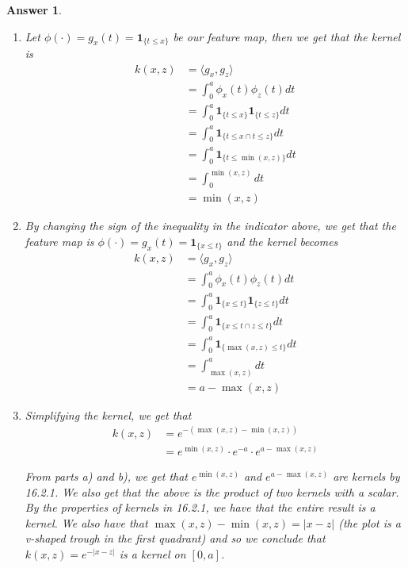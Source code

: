 \documentclass[12pt]{article}
\theoremstyle{colon}
\newtheorem*{answer}{Answer}
\begin{document}
\begin{answer}
  \

  \begin{enumerate}[label=\alph*)]
    \item Let $\phi(\cdot) = g_x(t) = \bm{1}_{\{t \leq x\}}$ be our feature map, then we get that the kernel is
      \begin{align*}
        k(x, z) &= \langle g_x, g_z \rangle \\
        &= \int_0^a \phi_x(t) \phi_z(t) dt \\
        &= \int_0^a \bm{1}_{\{t \leq x\}} \bm{1}_{\{t \leq z\}} dt \\
        &= \int_0^a \bm{1}_{\{t \leq x \cap t \leq z\}} dt \\
        &= \int_0^a \bm{1}_{\{t \leq \min(x,z)\}} dt \\
        &= \int_0^{\min(x,z)} dt \\
        &= \min(x,z)
      \end{align*}

    \item By changing the sign of the inequality in the indicator above, we get that the feature map is $\phi(\cdot) = g_x(t) = \bm{1}_{\{x \leq t\}}$ and the kernel becomes
      \begin{align*}
        k(x, z) &= \langle g_x, g_z \rangle \\
        &= \int_0^a \phi_x(t) \phi_z(t) dt \\
        &= \int_0^a \bm{1}_{\{x \leq t\}} \bm{1}_{\{z \leq t\}} dt \\
        &= \int_0^a \bm{1}_{\{x \leq t \cap z \leq t\}} dt \\
        &= \int_0^a \bm{1}_{\{\max(x,z) \leq t\}} dt \\
        &= \int_{\max(x,z)}^a dt \\
        &= a - \max(x,z)
      \end{align*}

    \item Simplifying the kernel, we get that
      \begin{align*}
        k(x, z) &= e^{-(\max(x,z) - \min(x,z))} \\
        &= e^{\min(x,z)} \cdot e^{-a} \cdot e^{a - \max(x,z)}
      \end{align*}

      From parts a) and b), we get that $e^{\min(x,z)}$ and $e^{a - \max(x,z)}$ are kernels by 16.2.1. We also get that the above is the product of two kernels with a scalar. By the properties of kernels in 16.2.1, we have that the entire result is a kernel. We also have that $\max(x,z) - \min(x,z) = \lvert x - z \rvert$ (the plot is a v-shaped trough in the first quadrant) and so we conclude that $k(x,z) = e^{-\lvert x - z \rvert}$ is a kernel on $[0,a]$.


\end{enumerate}
\end{answer}
\end{document}

